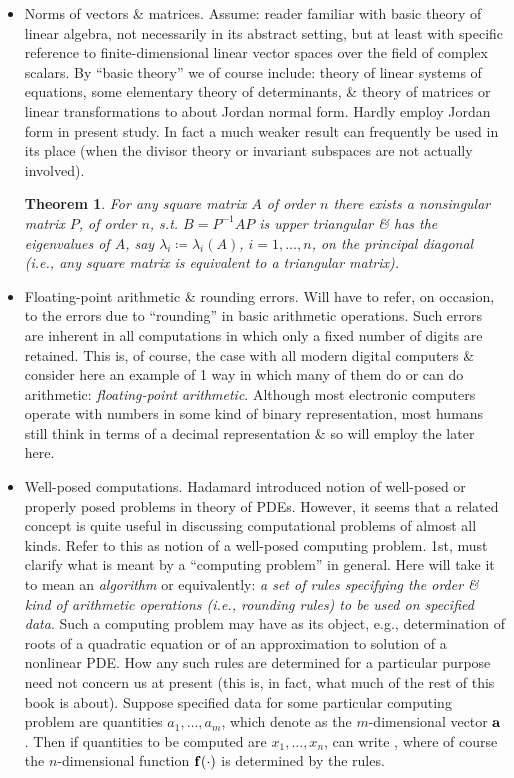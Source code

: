 \documentclass{article}
\newtheorem{theorem}{Theorem}
\begin{document}
\begin{enumerate}
\begin{itemize}
\begin{itemize}
			\item {\sf Norms of vectors \& matrices.} Assume: reader familiar with basic theory of linear algebra, not necessarily in its abstract setting, but at least with specific reference to finite-dimensional linear vector spaces over the field of complex scalars. By ``basic theory'' we of course include: theory of linear systems of equations, some elementary theory of determinants, \& theory of matrices or linear transformations to about Jordan normal form. Hardly employ Jordan form in present study. In fact a much weaker result can frequently be used in its place (when the divisor theory or invariant subspaces are not actually involved). 
			
			\begin{theorem}
				For any square matrix $A$ of order $n$ there exists a nonsingular matrix $P$, of order $n$, s.t. $B = P^{-1}AP$ is upper triangular \& has the eigenvalues of $A$, say $\lambda_i\coloneqq\lambda_i(A)$, $i = 1,\ldots,n$, on the principal diagonal (i.e., any square matrix is equivalent to a triangular matrix).
			\end{theorem}
			\item {\sf Floating-point arithmetic \& rounding errors.} Will have to refer, on occasion, to the errors due to ``rounding'' in basic arithmetic operations. Such errors are inherent in all computations in which only a fixed number of digits are retained. This is, of course, the case with all modern digital computers \& consider here an example of 1 way in which many of them do or can do arithmetic: {\it floating-point arithmetic}. Although most electronic computers operate with numbers in some kind of binary representation, most humans still think in terms of a decimal representation \& so will employ the later here.
			\item {\sf Well-posed computations.} {\sc Hadamard} introduced notion of well-posed or properly posed problems in theory of PDEs. However, it seems that a related concept is quite useful in discussing computational problems of almost all kinds. Refer to this as notion of a well-posed computing problem. 1st, must clarify what is meant by a ``computing problem'' in general. Here will take it to mean an {\it algorithm} or equivalently: {\it a set of rules specifying the order \& kind of arithmetic operations (i.e., rounding rules) to be used on specified data}. Such a computing problem may have as its object, e.g., determination of roots of a quadratic equation or of an approximation to solution of a nonlinear PDE. How any such rules are determined for a particular purpose need not concern us at present (this is, in fact, what much of the rest of this book is about). Suppose specified data for some particular computing problem are quantities $a_1,\ldots,a_m$, which denote as the $m$-dimensional vector ${\bf a}$. Then if quantities to be computed are $x_1,\ldots,x_n$, can write , where of course the $n$-dimensional function ${\bf f}(\cdot)$ is determined by the rules.
			

\end{itemize}
\end{itemize}
\end{enumerate}
\end{document}
